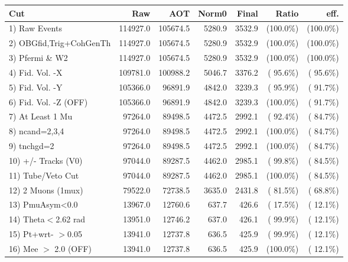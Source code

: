  \begin{table}[h!]\centering
 \begin{tabular}{||l||r|r|r|r|r|r||}
 \hline
 \hline
 Cut & Raw & AOT & Norm0 & Final & Ratio & eff.       \\
 \hline
  1) Raw Events           &     114927.0 &     105674.5 &       5280.9 &       3532.9 & (100.0\%) & (100.0\%) \\
  2) OBGfid,Trig+CohGenTh &     114927.0 &     105674.5 &       5280.9 &       3532.9 & (100.0\%) & (100.0\%) \\
  3) Pfermi \& W2         &     114927.0 &     105674.5 &       5280.9 &       3532.9 & (100.0\%) & (100.0\%) \\
  4) Fid. Vol. -X         &     109781.0 &     100988.2 &       5046.7 &       3376.2 & ( 95.6\%) & ( 95.6\%) \\
  5) Fid. Vol. -Y         &     105366.0 &      96891.9 &       4842.0 &       3239.3 & ( 95.9\%) & ( 91.7\%) \\
  6) Fid. Vol. -Z (OFF)   &     105366.0 &      96891.9 &       4842.0 &       3239.3 & (100.0\%) & ( 91.7\%) \\
  7) At Least 1 Mu        &      97264.0 &      89498.5 &       4472.5 &       2992.1 & ( 92.4\%) & ( 84.7\%) \\
  8) ncand=2,3,4          &      97264.0 &      89498.5 &       4472.5 &       2992.1 & (100.0\%) & ( 84.7\%) \\
  9) tnchgd=2             &      97264.0 &      89498.5 &       4472.5 &       2992.1 & (100.0\%) & ( 84.7\%) \\
 10) +/- Tracks (V0)      &      97044.0 &      89287.5 &       4462.0 &       2985.1 & ( 99.8\%) & ( 84.5\%) \\
 11) Tube/Veto Cut        &      97044.0 &      89287.5 &       4462.0 &       2985.1 & (100.0\%) & ( 84.5\%) \\
 12) 2 Muons (1mux)       &      79522.0 &      72738.5 &       3635.0 &       2431.8 & ( 81.5\%) & ( 68.8\%) \\
 13) PmuAsym<0.0          &      13967.0 &      12760.6 &        637.7 &        426.6 & ( 17.5\%) & ( 12.1\%) \\
 14) Theta$<$2.62 rad     &      13951.0 &      12746.2 &        637.0 &        426.1 & ( 99.9\%) & ( 12.1\%) \\
 15) Pt+wrt- $>$0.05      &      13941.0 &      12737.8 &        636.5 &        425.9 & ( 99.9\%) & ( 12.1\%) \\
 16) Mee $>$ 2.0  (OFF)   &      13941.0 &      12737.8 &        636.5 &        425.9 & (100.0\%) & ( 12.1\%) \\

\end{tabular}
\end{table}
